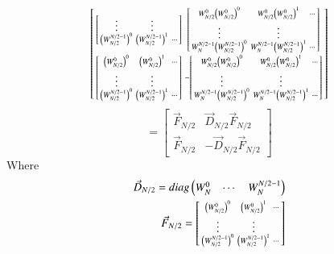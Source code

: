 \documentclass[journal,12pt,twocolumn]{IEEEtran}
\renewcommand\thesection{\arabic{section}}
\begin{document}
\begin{enumerate}[label=\thesection.\arabic*]
\begin{enumerate}[label=\arabic*.,ref=\thesection.\theenumi]
\begin{align}
\begin{bsmallmatrix}
\begin{bsmallmatrix}
				\vdots	& \vdots\\
				\left(W_{N/2}^{N/2 - 1}\right)^{0}	&	\left(W_{N/2}^{N/2 - 1}\right)^{1}	&	\cdots	
			\end{bsmallmatrix} & 
			\begin{bsmallmatrix}
				W_{N/2}^0\left(W_{N/2}^{0}\right)^{0}	&	W_{N/2}^0\left(W_{N/2}^{0}\right)^{1}	&	\cdots\\
				\vdots	& \vdots\\
				W_{N}^{N/2-1}\left(W_{N/2}^{N/2 - 1}\right)^{0}	&	W_{N}^{N/2-1}\left(W_{N/2}^{N/2 -1}\right)^{1}	&	\cdots\\
			\end{bsmallmatrix}\\
			\begin{bsmallmatrix}
				\left(W_{N/2}^{0}\right)^{0}	&	\left(W_{N/2}^{0}\right)^{1} 	&	\cdots\\
				\vdots	& \vdots\\
				\left(W_{N/2}^{N/2 - 1}\right)^{0}	&	\left(W_{N/2}^{N/2 - 1}\right)^{1}	&	\cdots	
			\end{bsmallmatrix} &
			-\begin{bsmallmatrix}
				W_{N/2}^0\left(W_{N/2}^{0}\right)^{0}	&	W_{N/2}^0\left(W_{N/2}^{0}\right)^{1}	&	\cdots\\
				\vdots	& \vdots\\
				W_{N}^{N/2-1}\left(W_{N/2}^{N/2 - 1}\right)^{0}	&	W_{N}^{N/2-1}\left(W_{N/2}^{N/2 -1}\right)^{1}	&	\cdots\\
			\end{bsmallmatrix}\\
		\end{bsmallmatrix}
	\end{align}
	\begin{equation}
		= \begin{bmatrix}
			\vec{F}_{N/2}	&	\vec{D}_{N/2}	\vec{F}_{N/2}\\	
			\vec{F}_{N/2}	&	-\vec{D}_{N/2}	\vec{F}_{N/2}
		\end{bmatrix}
	\end{equation}
	Where
	\begin{align}
		\vec{D}_{N/2} = diag\begin{pmatrix}W_{N}^0 & \cdots & W_{N}^{N/2 - 1}\end{pmatrix}\\
		\vec{F}_{N/2} = 		\begin{bsmallmatrix}
			\left(W_{N/2}^{0}\right)^{0}	&	\left(W_{N/2}^{0}\right)^{1} 	&	\cdots\\
			\vdots	& \vdots\\
			\left(W_{N/2}^{N/2 - 1}\right)^{0}	&	\left(W_{N/2}^{N/2 - 1}\right)^{1}	&	\cdots	
		\end{bsmallmatrix}
	\end{align}

\end{enumerate}
\end{enumerate}
\end{document}
